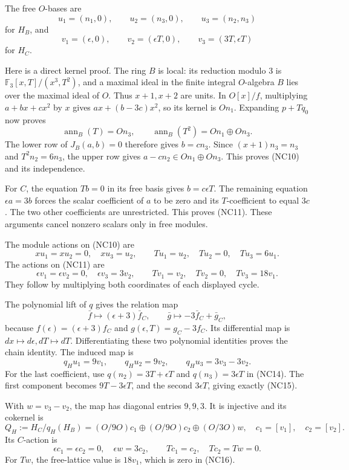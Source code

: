 \documentclass[
]{article}
\begin{document}
The free \(O\)-bases are \[
u_1=(n_1,0),\qquad u_2=(n_3,0),\qquad u_3=(n_2,n_3)
\tag{NC10}
\] for \(H_B\), and \[
v_1=(\epsilon,0),\qquad v_2=(\epsilon T,0),\qquad
v_3=(3T,\epsilon T)
\tag{NC11}
\] for \(H_C\).

Here is a direct kernel proof. The ring \(B\) is local: its reduction
modulo 3 is \(\mathbb F_3[x,T]/(x^3,T^2)\), and a maximal ideal in the
finite integral \(O\)-algebra \(B\) lies over the maximal ideal of
\(O\). Thus \(x+1,x+2\) are units. In \(O[x]/f\), multiplying
\(a+bx+cx^2\) by \(x\) gives \(ax+(b-3c)x^2\), so its kernel is
\(On_1\). Expanding \(p+Tq_0\) now proves \[
\operatorname{ann}_B(T)=On_3,\qquad
\operatorname{ann}_B(T^2)=On_1\oplus On_3.
\] The lower row of \(J_B(a,b)=0\) therefore gives \(b=cn_3\). Since
\((x+1)n_3=n_3\) and \(T^2n_2=6n_3\), the upper row gives
\(a-cn_2\in On_1\oplus On_3\). This proves (NC10) and its independence.

For \(C\), the equation \(Tb=0\) in its free basis gives
\(b=c\epsilon T\). The remaining equation \(\epsilon a=3b\) forces the
scalar coefficient of \(a\) to be zero and its \(T\)-coefficient to
equal \(3c\). The two other coefficients are unrestricted. This proves
(NC11). These arguments cancel nonzero scalars only in free modules.

The module actions on (NC10) are \[
xu_1=xu_2=0,\quad xu_3=u_2,\qquad
Tu_1=u_2,\quad Tu_2=0,\quad Tu_3=6u_1.
\tag{NC12}
\] The actions on (NC11) are \[
\epsilon v_1=\epsilon v_2=0,\quad\epsilon v_3=3v_2,\qquad
Tv_1=v_2,\quad Tv_2=0,\quad Tv_3=18v_1.
\tag{NC13}
\] They follow by multiplying both coordinates of each displayed cycle.

The polynomial lift of \(q\) gives the relation map \[
\bar f\longmapsto(\epsilon+3)\bar f_C,\qquad
\bar g\longmapsto-3\bar f_C+\bar g_C,
\tag{NC14}
\] because \(f(\epsilon)=(\epsilon+3)f_C\) and
\(g(\epsilon,T)=g_C-3f_C\). Its differential map is
\(dx\mapsto d\epsilon,dT\mapsto dT\). Differentiating these two
polynomial identities proves the chain identity. The induced map is \[
q_Hu_1=9v_1,\qquad q_Hu_2=9v_2,\qquad
q_Hu_3=3v_3-3v_2.
\tag{NC15}
\] For the last coefficient, use \(q(n_2)=3T+\epsilon T\) and
\(q(n_3)=3\epsilon T\) in (NC14). The first component becomes
\(9T-3\epsilon T\), and the second \(3\epsilon T\), giving exactly
(NC15).

With \(w=v_3-v_2\), the map has diagonal entries \(9,9,3\). It is
injective and its cokernel is \[
Q_H:=H_C/q_H(H_B)
=(O/9O)c_1\oplus(O/9O)c_2\oplus(O/3O)w,
\quad c_1=[v_1],\quad c_2=[v_2].
\tag{NC16}
\] Its \(C\)-action is \[
\epsilon c_1=\epsilon c_2=0,\quad\epsilon w=3c_2,\qquad
Tc_1=c_2,\quad Tc_2=Tw=0.
\tag{NC17}
\] For \(Tw\), the free-lattice value is \(18v_1\), which is zero in
(NC16).
\end{document}
